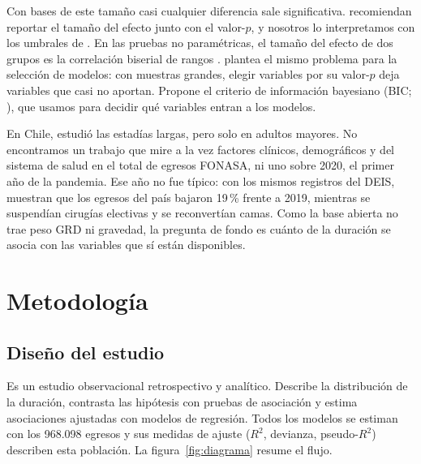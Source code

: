 \documentclass[10.5pt,a4paper,headings=small,abstract=false,bibliography=totoc,listof=totoc]{scrartcl}
\newcommand{\pct}{\,\%}
\begin{document}
Con bases de este tamaño casi cualquier diferencia sale significativa. \citet{lin2013} recomiendan reportar el tamaño del efecto junto con el valor-$p$, y nosotros lo interpretamos con los umbrales de \citet{cohen1988}. En las pruebas no paramétricas, el tamaño del efecto de dos grupos es la correlación biserial de rangos \citep{kerby2014}. \citet{raftery1995} plantea el mismo problema para la selección de modelos: con muestras grandes, elegir variables por su valor-$p$ deja variables que casi no aportan. Propone el criterio de información bayesiano (BIC; \citealt{schwarz1978}), que usamos para decidir qué variables entran a los modelos.

En Chile, \citet{olivares2020} estudió las estadías largas, pero solo en adultos mayores. No encontramos un trabajo que mire a la vez factores clínicos, demográficos y del sistema de salud en el total de egresos FONASA, ni uno sobre 2020, el primer año de la pandemia. Ese año no fue típico: con los mismos registros del DEIS, \citet{barahona2021} muestran que los egresos del país bajaron 19\pct{} frente a 2019, mientras se suspendían cirugías electivas y se reconvertían camas. Como la base abierta no trae peso GRD ni gravedad, la pregunta de fondo es cuánto de la duración se asocia con las variables que sí están disponibles.

\section{Metodología}

\subsection{Diseño del estudio}

Es un estudio observacional retrospectivo y analítico. Describe la distribución de la duración, contrasta las hipótesis con pruebas de asociación y estima asociaciones ajustadas con modelos de regresión. Todos los modelos se estiman con los 968.098 egresos y sus medidas de ajuste ($R^2$, devianza, pseudo-$R^2$) describen esta población. La figura~\ref{fig:diagrama} resume el flujo.
\end{document}
